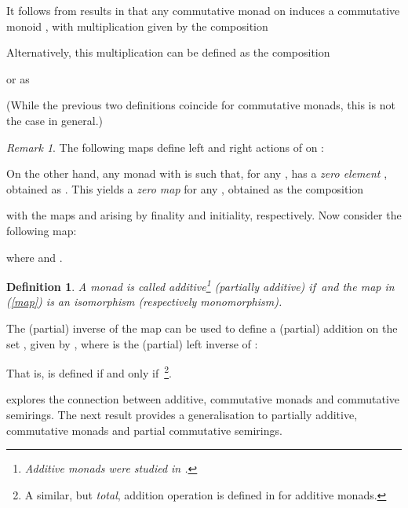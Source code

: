 \documentclass[submission,copyright,creativecommons]{eptcs}
\theoremstyle{plain}\newtheorem{theorem}{Theorem}[section]
\newtheorem{definition}[theorem]{Definition}
\theoremstyle{remark}
\newtheorem{remark}{Remark}[section]
\begin{document}
It follows from results in \cite{CoumansJ2011} that any commutative monad  on  induces a commutative monoid , with multiplication  given by the composition

Alternatively, this multiplication can be defined as the composition

or as

(While the previous two definitions coincide for commutative monads, this is not the case in general.)
\begin{remark}
\label{actions}
The following maps define left and right actions of  on :

\end{remark}

On the other hand, any monad  with {} is such that, for any ,  has a \emph{zero element} , obtained as . This yields a \emph{zero map } for any , obtained as the composition

with the maps  and  arising by finality and initiality, respectively. Now consider the following map:

where  and .
\begin{definition}
\label{additive}
A monad  is called \emph{additive}\footnote{Additive monads were studied in \cite{Kock2011,CoumansJ2011}.} (\emph{partially additive}) if\,  and the map in (\ref{map}) is an isomorphism (respectively monomorphism).
\end{definition}
 The (partial) inverse of the map  can be used to define a (partial) addition on the set , given by , where  is the (partial) left inverse of :
 
That is,  is defined if and only if \,\footnote{A similar, but \emph{total}, addition operation is defined in \cite{Kock2011,CoumansJ2011} for additive monads.}.

\cite[Section~5.2]{CoumansJ2011} explores the connection between additive, commutative monads and commutative semirings. The next result provides a generalisation to partially additive, commutative monads and partial commutative semirings. 
\end{document}
